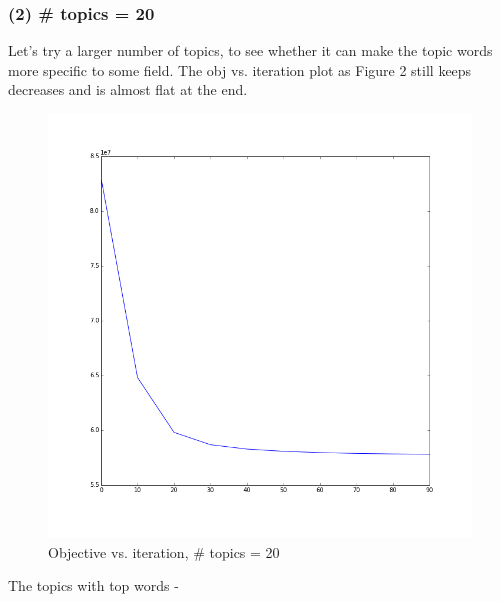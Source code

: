 \documentclass[submit]{harvardml}
\begin{document}
\subsubsection*{(2) \# topics = 20}

Let's try a larger number of topics, to see whether it can make the topic words more specific to some field. The obj vs. iteration plot as Figure 2 still keeps decreases and is almost flat at the end.

\begin{figure}[h]
    \centering
    \includegraphics[scale=0.45]{prob4-20.png}
    \caption{Objective vs. iteration, \# topics = 20}
\end{figure}

The topics with top words - 
\end{document}
